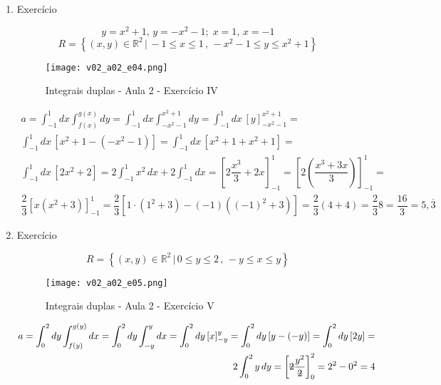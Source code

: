 \begin{enumerate}
	\item Exercício
	
	\begin{equation*}
		y = x^2 + 1 ,\, y = -x^2 - 1 ;\; x = 1 ,\, x = -1
	\end{equation*}
	\begin{equation*}
		R = \left\{(x, y) \in \mathbb{R}^2 \,|\, -1 \leq x \leq 1 \,,\, -x^2 - 1 \leq y \leq x^2 + 1 \right\}
	\end{equation*}	
	\begin{figure}[htb]
		\caption{Integrais duplas - Aula 2 - Exercício IV}
		\label{v02_a02_e04}
		\centering
		\texttt{[image: v02\_a02\_e04.png]}		
	\end{figure}
	
	\begin{align*}
		a = \int_{-1}^1 dx \int_{f(x)}^{g(x)} dy = \int_{-1}^1 dx \int_{-x^2 - 1}^{x^2 + 1} dy = \int_{-1}^1 dx\, [y]_{-x^2 - 1}^{x^2 + 1} =\\ \int_{-1}^1 dx\, \left[x^2 + 1 - \left(-x^2 - 1\right)\right] = \int_{-1}^1 dx\, \left[x^2 + 1 + x^2 + 1\right] =\\ \int_{-1}^1 dx\, \left[2x^2 + 2\right] = 2\int_{-1}^1 x^2\, dx + 2\int_{-1}^1 dx = \left[2\dfrac{x^3}{3} +  2x\right]_{-1}^1 = \left[2\left(\dfrac{x^3 + 3x}{3}\right)\right]_{-1}^1 =\\ \dfrac{2}{3}\left[x\left(x^2 + 3\right)\right]_{-1}^1 = \dfrac{2}{3}\left[1 \cdot \left(1^2 + 3\right) - (-1)\left((-1)^2 + 3\right)\right] = \dfrac{2}{3}(4 + 4) = \dfrac{2}{3}8 = \dfrac{16}{3} = 5,\overline{3}	
	\end{align*}
		
	\item Exercício
	
	\begin{equation*}
		R = \left\{(x, y) \in \mathbb{R}^2 \,|\, 0 \leq y \leq 2 \,,\, -y \leq x \leq y \right\}
	\end{equation*}
		
	\begin{figure}[htb]
		\caption{Integrais duplas - Aula 2 - Exercício V}
		\label{v02_a02_e05}
		\centering
		\texttt{[image: v02\_a02\_e05.png]}		
	\end{figure}
	
	\begin{align*}
		a = \int_0^2 dy \int_{f(y)}^{g(y)} dx = \int_0^2 dy \int_{-y}^y dx = \int_0^2 dy\, [x]_{-y}^y = \int_0^2 dy\, [y - (-y)] = \int_0^2 dy\, [2y] =\\ 2\int_0^2 y\, dy = \left[\overstrike{2}\frac{y^2}{\overstrike{2}}\right]_0^2 = 2^2 - 0^2 = 4
	\end{align*}
\end{enumerate}